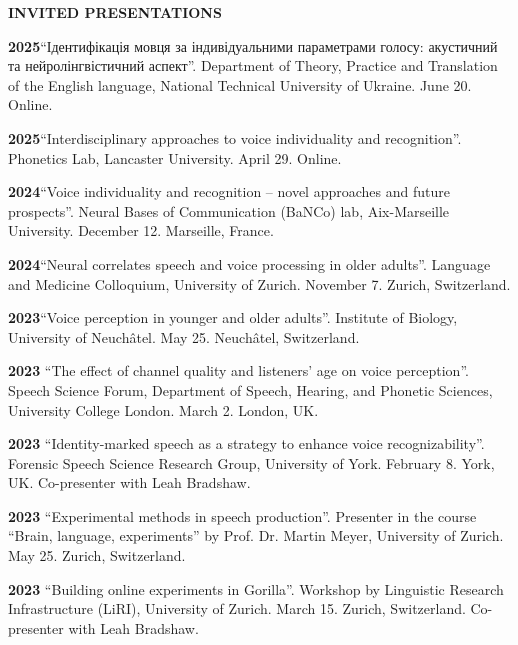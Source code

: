 \documentclass[11pt]{article}
\newcommand{\hangpara}{
 \setlength{\parindent}{0in} %
 \hangindent=0.42in %
}
\begin{document}
\vskip 20pt
\begin{flushleft}
{\bf INVITED PRESENTATIONS}
\end{flushleft}

\hangpara
{\bf 2025}\hspace{1ex}“Ідентифікація мовця за індивідуальними параметрами голосу: акустичний та нейролінгвістичний аспект”. Department of Theory, Practice and Translation of the English language, National Technical University of Ukraine. June 20. Online. 

\vskip 6pt
\hangpara
{\bf 2025}\hspace{1ex}“Interdisciplinary approaches to voice individuality and recognition”. Phonetics Lab, Lancaster University. April 29. Online. 

\vskip 6pt
\hangpara
{\bf 2024}\hspace{1ex}“Voice individuality and recognition – novel approaches and future prospects”. Neural Bases of Communication (BaNCo) lab, Aix-Marseille University. December 12. Marseille, France. 

\vskip 6pt
\hangpara
{\bf 2024}\hspace{1ex}“Neural correlates speech and voice processing in older adults”. Language and Medicine Colloquium, University of Zurich. November 7. Zurich, Switzerland. 

\vskip 6pt
\hangpara
{\bf 2023}\hspace{1ex}“Voice perception in younger and older adults”. Institute of Biology, University of Neuchâtel. May 25. Neuchâtel, Switzerland. 

\vskip 6pt
\hangpara
{\bf 2023}\hspace{1ex} “The effect of channel quality and listeners’ age on voice perception”. Speech Science Forum, Department of Speech, Hearing, and Phonetic Sciences, University College London. March 2. London, UK.

\vskip 6pt
\hangpara
{\bf 2023}\hspace{1ex} “Identity-marked speech as a strategy to enhance voice recognizability”. Forensic Speech Science Research Group, University of York. February 8. York, UK. Co-presenter with Leah Bradshaw.

\vskip 6pt
\hangpara
{\bf 2023}\hspace{1ex} “Experimental methods in speech production”. Presenter in the course “Brain, language, experiments” by Prof. Dr. Martin Meyer, University of Zurich. May 25. Zurich, Switzerland. 

\vskip 6pt
\hangpara
{\bf 2023}\hspace{1ex} “Building online experiments in Gorilla”. Workshop by Linguistic Research Infrastructure (LiRI), University of Zurich. March 15. Zurich, Switzerland. Co-presenter with Leah Bradshaw.
\end{document}
